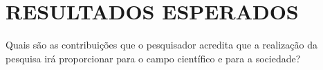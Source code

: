 \section{RESULTADOS ESPERADOS}
Quais são as contribuições que o pesquisador acredita que a realização da pesquisa irá proporcionar para o campo científico e para a sociedade?

